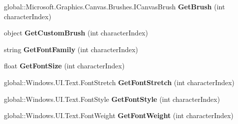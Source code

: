 \begin{DoxyCompactItemize}
global\+::\+Microsoft.\+Graphics.\+Canvas.\+Brushes.\+I\+Canvas\+Brush {\bfseries Get\+Brush} (int character\+Index)
\item 
\mbox{\label{class_microsoft_1_1_graphics_1_1_canvas_1_1_text_1_1_canvas_text_layout_ab9ac76cc2bcb25f7196995587caf4e68}} 
object {\bfseries Get\+Custom\+Brush} (int character\+Index)
\item 
\mbox{\label{class_microsoft_1_1_graphics_1_1_canvas_1_1_text_1_1_canvas_text_layout_af4f53cf9d9dddc4bfa0669a57c6a4084}} 
string {\bfseries Get\+Font\+Family} (int character\+Index)
\item 
\mbox{\label{class_microsoft_1_1_graphics_1_1_canvas_1_1_text_1_1_canvas_text_layout_a0597b8dfd8edb6f68a71f116703648c7}} 
float {\bfseries Get\+Font\+Size} (int character\+Index)
\item 
\mbox{\label{class_microsoft_1_1_graphics_1_1_canvas_1_1_text_1_1_canvas_text_layout_a7ae8624ebdfdcb49fb9d365b6c8c6404}} 
global\+::\+Windows.\+U\+I.\+Text.\+Font\+Stretch {\bfseries Get\+Font\+Stretch} (int character\+Index)
\item 
\mbox{\label{class_microsoft_1_1_graphics_1_1_canvas_1_1_text_1_1_canvas_text_layout_a84a97afe4a7b871703795677195da761}} 
global\+::\+Windows.\+U\+I.\+Text.\+Font\+Style {\bfseries Get\+Font\+Style} (int character\+Index)
\item 
\mbox{\label{class_microsoft_1_1_graphics_1_1_canvas_1_1_text_1_1_canvas_text_layout_ad0c1b485da46a633fa7740206bc21f8f}} 
global\+::\+Windows.\+U\+I.\+Text.\+Font\+Weight {\bfseries Get\+Font\+Weight} (int character\+Index)
\item 
\mbox{\label{class_microsoft_1_1_graphics_1_1_canvas_1_1_text_1_1_canvas_text_layout_ad1e03e0c5fae952c5b9c1e2dc0efe6de}} 

\end{DoxyCompactItemize}
